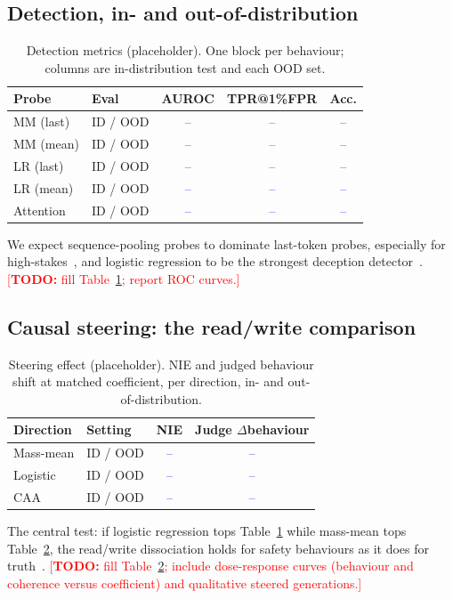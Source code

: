 \documentclass[conference]{IEEEtran}
\newcommand{\TODO}[1]{\textcolor{red}{[\textbf{TODO:} #1]}}
\newcommand{\NUM}[1]{\textcolor{blue}{#1}} %
\begin{document}
\subsection{Detection, in- and out-of-distribution}
\begin{table}[htbp]
\caption{Detection metrics (placeholder). One block per behaviour;
columns are in-distribution test and each OOD set.}
\begin{center}
\begin{tabular}{llccc}
\toprule
Probe & Eval & AUROC & TPR@1\%FPR & Acc. \\
\midrule
MM (last)     & ID / OOD & \NUM{--} & \NUM{--} & \NUM{--} \\
MM (mean)     & ID / OOD & \NUM{--} & \NUM{--} & \NUM{--} \\
LR (last)     & ID / OOD & \NUM{--} & \NUM{--} & \NUM{--} \\
LR (mean)     & ID / OOD & \NUM{--} & \NUM{--} & \NUM{--} \\
Attention     & ID / OOD & \NUM{--} & \NUM{--} & \NUM{--} \\
\bottomrule
\end{tabular}
\label{tab:detection}
\end{center}
\end{table}
We expect sequence-pooling probes to dominate last-token probes, especially for
high-stakes~\cite{mckenzie2025}, and logistic regression to be the strongest
deception detector~\cite{goldowsky2025}.
\TODO{fill Table~\ref{tab:detection}; report ROC curves.}

\subsection{Causal steering: the read/write comparison}
\begin{table}[htbp]
\caption{Steering effect (placeholder). NIE and judged behaviour shift at
matched coefficient, per direction, in- and out-of-distribution.}
\begin{center}
\begin{tabular}{llcc}
\toprule
Direction & Setting & NIE & Judge $\Delta$behaviour \\
\midrule
Mass-mean & ID / OOD & \NUM{--} & \NUM{--} \\
Logistic  & ID / OOD & \NUM{--} & \NUM{--} \\
CAA       & ID / OOD & \NUM{--} & \NUM{--} \\
\bottomrule
\end{tabular}
\label{tab:steering}
\end{center}
\end{table}
The central test: if logistic regression tops Table~\ref{tab:detection} while
mass-mean tops Table~\ref{tab:steering}, the read/write dissociation holds for
safety behaviours as it does for truth~\cite{marks2024}.
\TODO{fill Table~\ref{tab:steering}; include dose-response curves (behaviour and
coherence versus coefficient) and qualitative steered generations.}
\end{document}
